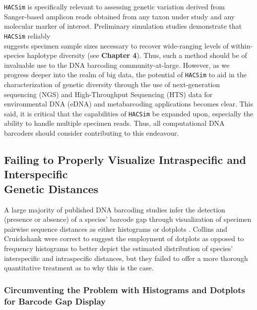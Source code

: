 {\tt HACSim} is specifically relevant to assessing genetic variation derived from \\ Sanger-based amplicon reads obtained from any taxon under study and any molecular marker of interest. Preliminary simulation studies demonstrate that {\tt HACSim} reliably \\ suggests specimen sample sizes necessary to recover wide-ranging levels of within-species haplotype diversity (see \textbf {Chapter 4}). Thus, such a method should be of invaluable use to the DNA barcoding community-at-large. However, as we progress deeper into the realm of big data, the potential of {\tt HACSim} to aid in the characterization of genetic diversity through the use of next-generation sequencing (NGS) and High-Throughput Sequencing (HTS) data for environmental DNA (eDNA) and metabarcoding applications \cite{elbrecht2018estimating} becomes clear. This said, it is critical that the capabilities of {\tt HACSim} be expanded upon, especially the ability to handle multiple specimen reads. Thus, all computational DNA barcoders should consider contributing to this endeavour.



\subsection{Failing to Properly Visualize Intraspecific and Interspecific \\ Genetic Distances}

A large majority of published DNA barcoding studies infer the detection (presence or absence) of a species' barcode gap through visualization of specimen pairwise sequence distances as either histograms or dotplots \cite{collins2013seven}. Collins and Cruickshank \cite{collins2013seven} were correct to suggest the employment of dotplots as opposed to frequency histograms to better depict the estimated distribution of species' interspecific and intraspecific distances, but they failed to offer a more thorough quantitative treatment as to why this is the case. 



\subsubsection{Circumventing the Problem with Histograms and Dotplots for Barcode Gap Display}

